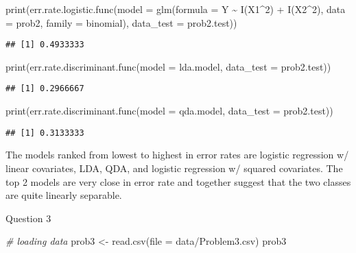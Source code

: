 \documentclass[
]{article}
\newenvironment{Shaded}{\begin{snugshade}}{\end{snugshade}}
\newcommand{\AttributeTok}[1]{\textcolor[rgb]{0.77,0.63,0.00}{#1}}
\newcommand{\CommentTok}[1]{\textcolor[rgb]{0.56,0.35,0.01}{\textit{#1}}}
\newcommand{\DecValTok}[1]{\textcolor[rgb]{0.00,0.00,0.81}{#1}}
\newcommand{\FunctionTok}[1]{\textcolor[rgb]{0.00,0.00,0.00}{#1}}
\newcommand{\NormalTok}[1]{#1}
\newcommand{\OtherTok}[1]{\textcolor[rgb]{0.56,0.35,0.01}{#1}}
\newcommand{\SpecialCharTok}[1]{\textcolor[rgb]{0.00,0.00,0.00}{#1}}
\newcommand{\StringTok}[1]{\textcolor[rgb]{0.31,0.60,0.02}{#1}}
\begin{document}
\begin{Shaded}
\begin{Highlighting}[]
\FunctionTok{print}\NormalTok{(}\FunctionTok{err.rate.logistic.func}\NormalTok{(}\AttributeTok{model =} \FunctionTok{glm}\NormalTok{(}\AttributeTok{formula =}\NormalTok{ Y }\SpecialCharTok{\textasciitilde{}} \FunctionTok{I}\NormalTok{(X1}\SpecialCharTok{\^{}}\DecValTok{2}\NormalTok{) }\SpecialCharTok{+} \FunctionTok{I}\NormalTok{(X2}\SpecialCharTok{\^{}}\DecValTok{2}\NormalTok{), }\AttributeTok{data =}\NormalTok{ prob2, }\AttributeTok{family =}\NormalTok{ binomial), }\AttributeTok{data\_test =}\NormalTok{ prob2.test))}
\end{Highlighting}
\end{Shaded}

\begin{verbatim}
## [1] 0.4933333
\end{verbatim}

\begin{Shaded}
\begin{Highlighting}[]
\FunctionTok{print}\NormalTok{(}\FunctionTok{err.rate.discriminant.func}\NormalTok{(}\AttributeTok{model =}\NormalTok{ lda.model, }\AttributeTok{data\_test =}\NormalTok{ prob2.test))}
\end{Highlighting}
\end{Shaded}

\begin{verbatim}
## [1] 0.2966667
\end{verbatim}

\begin{Shaded}
\begin{Highlighting}[]
\FunctionTok{print}\NormalTok{(}\FunctionTok{err.rate.discriminant.func}\NormalTok{(}\AttributeTok{model =}\NormalTok{ qda.model, }\AttributeTok{data\_test =}\NormalTok{ prob2.test))}
\end{Highlighting}
\end{Shaded}

\begin{verbatim}
## [1] 0.3133333
\end{verbatim}

The models ranked from lowest to highest in error rates are logistic
regression w/ linear covariates, LDA, QDA, and logistic regression w/
squared covariates. The top 2 models are very close in error rate and
together suggest that the two classes are quite linearly separable.

Question 3

\begin{Shaded}
\begin{Highlighting}[]
\CommentTok{\# loading data}
\NormalTok{prob3 }\OtherTok{\textless{}{-}} \FunctionTok{read.csv}\NormalTok{(}\AttributeTok{file =} \StringTok{\textquotesingle{}data/Problem3.csv\textquotesingle{}}\NormalTok{)}
\NormalTok{prob3}
\end{Highlighting}
\end{Shaded}
\end{document}

